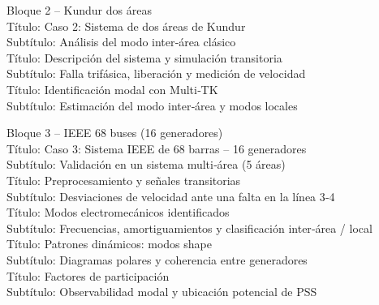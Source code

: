 \documentclass{beamer}
\begin{document}
\begin{frame}
Bloque 2 – Kundur dos áreas\\
Título: Caso 2: Sistema de dos áreas de Kundur\\
Subtítulo: Análisis del modo inter‑área clásico\\

Título: Descripción del sistema y simulación transitoria\\
Subtítulo: Falla trifásica, liberación y medición de velocidad\\

Título: Identificación modal con Multi‑TK\\
Subtítulo: Estimación del modo inter‑área y modos locales\\

\end{frame}

\begin{frame}
  Bloque 3 – IEEE 68 buses (16 generadores)\\
Título: Caso 3: Sistema IEEE de 68 barras – 16 generadores\\
Subtítulo: Validación en un sistema multi‑área (5 áreas)\\

Título: Preprocesamiento y señales transitorias\\
Subtítulo: Desviaciones de velocidad ante una falta en la línea 3‑4\\

Título: Modos electromecánicos identificados\\
Subtítulo: Frecuencias, amortiguamientos y clasificación inter‑área / local\\

Título: Patrones dinámicos: modos shape\\
Subtítulo: Diagramas polares y coherencia entre generadores\\

Título: Factores de participación\\
Subtítulo: Observabilidad modal y ubicación potencial de PSS\\

\end{frame}
\end{document}
